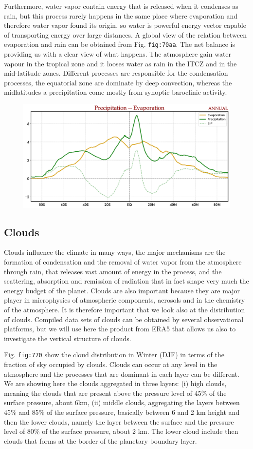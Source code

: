 Furthermore, water vapor contain energy that is released when it
condenses as rain, but this process rarely happens in the same place
where evaporation and therefore water vapor found its origin, so water
is powerful energy vector capable of transporting energy over large
distances. A global view of the relation between evaporation and rain
can be obtained from Fig. \texttt{fig:70aa}. The net balance is
providing us with a clear view of what happens. The atmosphere gain
water vapour in the tropical zone and it looses water as rain in the
ITCZ and in the mid-latitude zones. Different processes are responsible
for the condensation processes, the equatorial zone are dominate by deep
convection, whereas the midlatitudes a precipitation come mostly from
synoptic baroclinic activity.

\begin{figure}
\centering
\includegraphics[width = .7 \textwidth]{figs/GD/PrecEvapALLJJA.png}
\caption{} \label{fig:}
\end{figure}

\subsection{Clouds}\label{clouds}

Clouds influence the climate in many ways, the major mechanisms are the
formation of condensation and the removal of water vapor from the
atmosphere through rain, that releases vast amount of energy in the
process, and the scattering, absorption and remission of radiation that
in fact shape very much the energy budget of the planet. Clouds are also
important because they are major player in microphysics of atmospheric
components, aerosols and in the chemistry of the atmosphere. It is
therefore important that we look also at the distribution of clouds.
Compiled data sets of clouds can be obtained by several observational
platforms, but we will use here the product from ERA5 that allows us
also to investigate the vertical structure of clouds.

Fig. \texttt{fig:770} show the cloud distribution in Winter (DJF) in
terms of the fraction of sky occupied by clouds. Clouds can occur at any
level in the atmosphere and the processes that are dominant in each
layer can be different. We are showing here the clouds aggregated in
three layers: (i) high clouds, meaning the clouds that are present above
the pressure level of 45\% of the surface pressure, about 6km, (ii)
middle clouds, aggregating the layers between 45\% and 85\% of the
surface pressure, basically between 6 and 2 km height and then the lower
clouds, namely the layer between the surface and the pressure level of
80\% of the surface pressure, about 2 km. The lower cloud include then
clouds that forms at the border of the planetary boundary layer.

